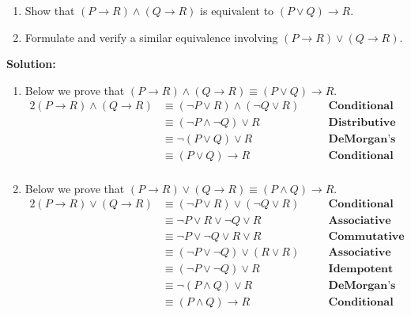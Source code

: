 \begin{enumerate}[label=(\alph*)]
    \item Show that $(P \rightarrow R) \wedge (Q \rightarrow R)$ is equivalent to $(P \vee Q) \rightarrow R$.
    \item Formulate and verify a similar equivalence involving $(P \rightarrow R) \vee (Q \rightarrow R)$.
\end{enumerate}
\textbf{Solution:}
\begin{enumerate}[label=(\alph*)]
    \item Below we prove that $(P \rightarrow R) \wedge (Q \rightarrow R) \equiv (P \vee Q) \rightarrow R$.
    \begin{alignat*}{2}
        (P \rightarrow R) \wedge (Q \rightarrow R) &\equiv (\neg P \vee R) \wedge (\neg Q \vee R) && \quad \textbf{Conditional Law}\\
        &\equiv (\neg P \wedge \neg Q) \vee R && \quad \textbf{Distributive Law}\\
        &\equiv \neg (P \vee Q) \vee R && \quad \textbf{DeMorgan's Law}\\
        &\equiv (P \vee Q) \rightarrow R && \quad \textbf{Conditional Law}\\
    \end{alignat*}

    \item Below we prove that $(P \rightarrow R) \vee (Q \rightarrow R) \equiv (P \wedge Q) \rightarrow R$.
    \begin{alignat*}{2}
        (P \rightarrow R) \vee (Q \rightarrow R) &\equiv (\neg P \vee R) \vee (\neg Q \vee R) && \quad \textbf{Conditional Law}\\
        &\equiv \neg P \vee R \vee \neg Q \vee R && \quad \textbf{Associative Law}\\
        &\equiv \neg P \vee \neg Q \vee R \vee R && \quad \textbf{Commutative Law}\\
        &\equiv (\neg P \vee \neg Q) \vee (R \vee R) && \quad \textbf{Associative Law}\\
        &\equiv (\neg P \vee \neg Q) \vee R && \quad \textbf{Idempotent Law}\\
        &\equiv \neg (P \wedge Q) \vee R && \quad \textbf{DeMorgan's Law}\\
        &\equiv (P \wedge Q) \rightarrow R && \quad \textbf{Conditional Law}\\
    \end{alignat*}
\end{enumerate}
\pagebreak